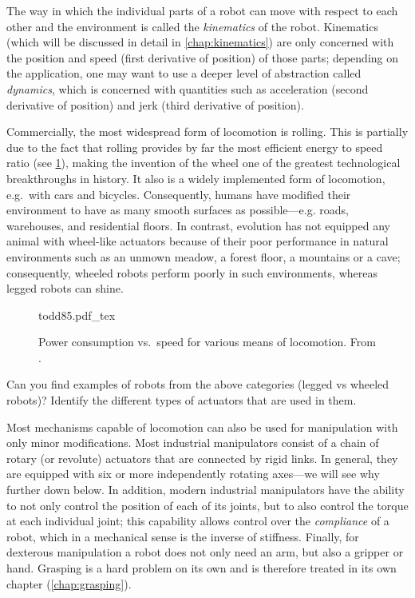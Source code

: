 The way in which the individual parts of a robot can move with respect to each other and the environment is called the \textsl{kinematics} of the robot. Kinematics (which will be discussed in detail in \cref{chap:kinematics}) are only concerned with the position and speed (first derivative of position) of those parts; depending on the application, one may want to use a deeper level of abstraction called \textsl{dynamics}, which is concerned with quantities such as acceleration (second derivative of position) and jerk (third derivative of position).

Commercially, the most widespread form of locomotion is rolling. This is partially due to the fact that rolling provides by far the most efficient energy to speed ratio (see \cref{fig:todd}), making the invention of the wheel one of the greatest technological breakthroughs in history. It also is a widely implemented form of locomotion, e.g.\ with cars and bicycles. Consequently, humans have modified their environment to have as many smooth surfaces as possible---e.g. roads, warehouses, and residential floors.
%
In contrast, evolution has not equipped any animal with wheel-like actuators because of their poor performance in natural environments such as an unmown meadow, a forest floor, a mountains or a cave; consequently, wheeled robots perform poorly in such environments, whereas legged robots can shine.

\begin{figure}
    \centering
    \def\svgwidth{0.8\textwidth}
    {todd85.pdf_tex}
    \caption{Power consumption vs.\ speed for various means of locomotion. From \protect{}.}
    \label{fig:todd}
\end{figure}


\begin{mdframed}Can you find examples of robots from the above categories (legged vs wheeled robots)? Identify the different types of actuators that are used in them.
\end{mdframed}

Most mechanisms capable of locomotion can also be used for manipulation with only minor modifications. Most industrial manipulators consist of a chain of rotary (or revolute) actuators that are connected by rigid links. In general, they are equipped with six or more independently rotating axes---we will see why further down below. In addition, modern industrial manipulators have the ability to not only control the position of each of its joints, but to also control the torque at each individual joint; this capability allows control over the \textsl{compliance} of a robot, which in a mechanical sense is the inverse of stiffness. Finally, for dexterous manipulation a robot does not only need an arm, but also a gripper or hand. Grasping is a hard problem on its own and is therefore treated in its own chapter (\cref{chap:grasping}).


